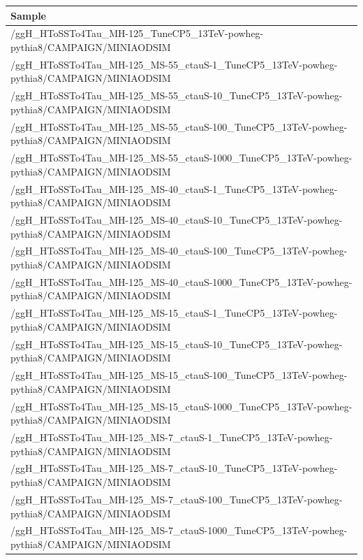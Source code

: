 \begin{table}[htb]
  \begin{center}
    \scriptsize
    \begin{tabular}{l}\hline
      Sample \\
      \hline
      /ggH\_HToSSTo4Tau\_MH-125\_TuneCP5\_13TeV-powheg-pythia8/CAMPAIGN/MINIAODSIM\\
      \hline
      /ggH\_HToSSTo4Tau\_MH-125\_MS-55\_ctauS-1\_TuneCP5\_13TeV-powheg-pythia8/CAMPAIGN/MINIAODSIM\\
      /ggH\_HToSSTo4Tau\_MH-125\_MS-55\_ctauS-10\_TuneCP5\_13TeV-powheg-pythia8/CAMPAIGN/MINIAODSIM\\
      /ggH\_HToSSTo4Tau\_MH-125\_MS-55\_ctauS-100\_TuneCP5\_13TeV-powheg-pythia8/CAMPAIGN/MINIAODSIM\\
      /ggH\_HToSSTo4Tau\_MH-125\_MS-55\_ctauS-1000\_TuneCP5\_13TeV-powheg-pythia8/CAMPAIGN/MINIAODSIM\\
      /ggH\_HToSSTo4Tau\_MH-125\_MS-40\_ctauS-1\_TuneCP5\_13TeV-powheg-pythia8/CAMPAIGN/MINIAODSIM\\
      /ggH\_HToSSTo4Tau\_MH-125\_MS-40\_ctauS-10\_TuneCP5\_13TeV-powheg-pythia8/CAMPAIGN/MINIAODSIM\\
      /ggH\_HToSSTo4Tau\_MH-125\_MS-40\_ctauS-100\_TuneCP5\_13TeV-powheg-pythia8/CAMPAIGN/MINIAODSIM\\
      /ggH\_HToSSTo4Tau\_MH-125\_MS-40\_ctauS-1000\_TuneCP5\_13TeV-powheg-pythia8/CAMPAIGN/MINIAODSIM\\
      /ggH\_HToSSTo4Tau\_MH-125\_MS-15\_ctauS-1\_TuneCP5\_13TeV-powheg-pythia8/CAMPAIGN/MINIAODSIM\\
      /ggH\_HToSSTo4Tau\_MH-125\_MS-15\_ctauS-10\_TuneCP5\_13TeV-powheg-pythia8/CAMPAIGN/MINIAODSIM\\
      /ggH\_HToSSTo4Tau\_MH-125\_MS-15\_ctauS-100\_TuneCP5\_13TeV-powheg-pythia8/CAMPAIGN/MINIAODSIM\\
      /ggH\_HToSSTo4Tau\_MH-125\_MS-15\_ctauS-1000\_TuneCP5\_13TeV-powheg-pythia8/CAMPAIGN/MINIAODSIM\\
      /ggH\_HToSSTo4Tau\_MH-125\_MS-7\_ctauS-1\_TuneCP5\_13TeV-powheg-pythia8/CAMPAIGN/MINIAODSIM\\
      /ggH\_HToSSTo4Tau\_MH-125\_MS-7\_ctauS-10\_TuneCP5\_13TeV-powheg-pythia8/CAMPAIGN/MINIAODSIM\\
      /ggH\_HToSSTo4Tau\_MH-125\_MS-7\_ctauS-100\_TuneCP5\_13TeV-powheg-pythia8/CAMPAIGN/MINIAODSIM\\
      /ggH\_HToSSTo4Tau\_MH-125\_MS-7\_ctauS-1000\_TuneCP5\_13TeV-powheg-pythia8/CAMPAIGN/MINIAODSIM\\
      \hline
    \end{tabular}
    \label{tab:sigsample}
  \end{center}
\end{table}




